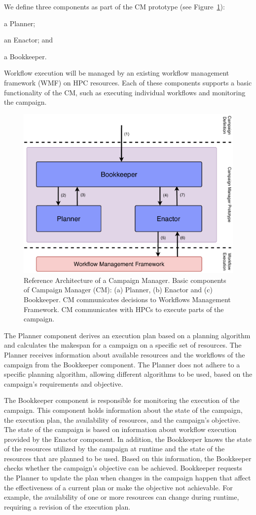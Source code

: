 We define three components as part of the CM prototype (see
Figure~\ref{fig:refarch}):
\begin{inparaenum}[(1)]
    \item a Planner;
    \item an Enactor; and
    \item a Bookkeeper.
\end{inparaenum}
Workflow execution will be managed by an existing workflow management framework
(WMF) on HPC resources. Each of these components supports a basic functionality
of the CM, such as executing individual workflows and monitoring
the campaign.

\begin{figure}[t]
    \centering
    \includegraphics[width=.75\textwidth]{figures/manager/CEM_design.pdf}
    \caption{Reference Architecture of a Campaign Manager. Basic components of
        Campaign Manager (CM): (a) Planner, (b) Enactor and (c) Bookkeeper. CM
        communicates decisions to Workflows Management Framework. CM
        communicates with HPCs to execute parts of the
        campaign.}\label{fig:refarch}
\end{figure}

The Planner component derives an execution plan based on a planning algorithm
and calculates the makespan for a campaign on a specific set of resources. The
Planner receives information about available resources and the workflows of the
campaign from the Bookkeeper component. The Planner does not adhere to a
specific planning algorithm, allowing different algorithms to be used, based on
the campaign's requirements and objective.

The Bookkeeper component is responsible for monitoring the execution of the
campaign. This component holds information about the state of the campaign, the
execution plan, the availability of resources, and the campaign's objective. The
state of the campaign is based on information about workflow execution provided
by the Enactor component. In addition, the Bookkeeper knows the state of the
resources utilized by the campaign at runtime and the state of the resources
that are planned to be used. Based on this information, the Bookkeeper checks
whether the campaign's objective can be achieved. Bookkeeper requests the
Planner to update the plan when changes in the campaign happen that
affect the effectiveness of a current plan or make the objective not achievable.
For example, the availability of one or more resources can change during
runtime, requiring a revision of the execution plan.

